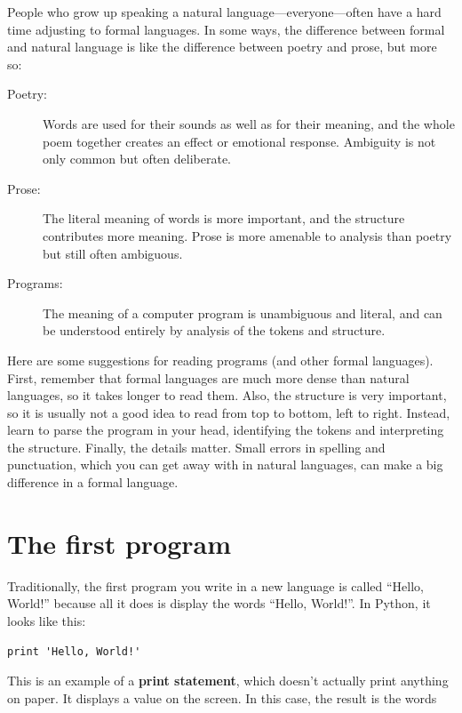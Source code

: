 \documentclass[10pt]{book}
\begin{document}
People who grow up speaking a natural language---everyone---often have a
hard time adjusting to formal languages.  In some ways, the difference
between formal and natural language is like the difference between
poetry and prose, but more so:

\begin{description}

\item[Poetry:] Words are used for their sounds as well as for
their meaning, and the whole poem together creates an effect or
emotional response.  Ambiguity is not only common but often
deliberate.

\item[Prose:] The literal meaning of words is more important,
and the structure contributes more meaning.  Prose is more amenable to
analysis than poetry but still often ambiguous.

\item[Programs:] The meaning of a computer program is unambiguous
and literal, and can be understood entirely by analysis of the
tokens and structure.

\end{description}

Here are some suggestions for reading programs (and other formal
languages).  First, remember that formal languages are much more dense
than natural languages, so it takes longer to read them.  Also, the
structure is very important, so it is usually not a good idea to read
from top to bottom, left to right.  Instead, learn to parse the
program in your head, identifying the tokens and interpreting the
structure.  Finally, the details matter.  Small errors in
spelling and punctuation, which you can get away
with in natural languages, can make a big difference in a formal
language.


\section{The first program}
\label{hello}

Traditionally, the first program you write in a new language
is called ``Hello, World!'' because all it does is display the
words ``Hello, World!''.  In Python, it looks like this:

\begin{verbatim}
print 'Hello, World!'
\end{verbatim}
%
This is an example of a {\bf print statement}, which
doesn't actually print anything on paper.  It displays a value on the
screen.  In this case, the result is the words
\end{document}
